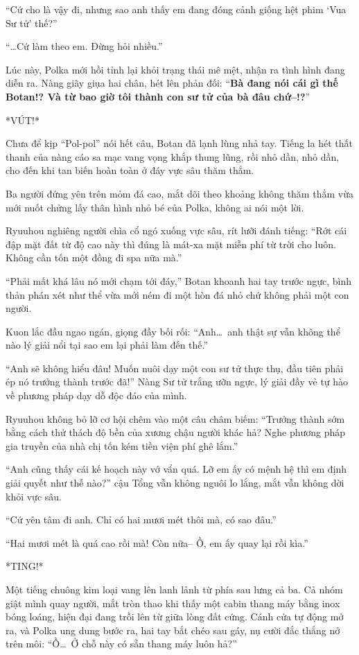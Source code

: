 \documentclass[../main.tex]{subfiles}
\begin{document}
``Cứ cho là vậy đi, nhưng sao anh thấy em đang đóng cảnh giống hệt phim `Vua Sư tử' thế?''

``\dots Cứ làm theo em. Đừng hỏi nhiều.''

Lúc này, Polka mới hồi tỉnh lại khỏi trạng thái mê mệt, nhận ra tình hình đang diễn ra. Nàng giãy giụa hai chân, hét lên phản đối: ``\textbf{Bà đang nói cái gì thế Botan!? Và từ bao giờ tôi thành con sư tử của bà đâu chứ--!?}''

*VÚT!*

Chưa để kịp ``Pol-pol'' nói hết câu, Botan đã lạnh lùng nhả tay. Tiếng la hét thất thanh của nàng cáo sa mạc vang vọng khắp thung lũng, rồi nhỏ dần, nhỏ dần, cho đến khi tan biến hoàn toàn ở đáy vực sâu thăm thẳm.


Ba người đứng yên trên mỏm đá cao, mắt dõi theo khoảng không thăm thẳm vừa mới nuốt chửng lấy thân hình nhỏ bé của Polka, không ai nói một lời.

Ryuuhou nghiêng người chìa cổ ngó xuống vực sâu, rít lưỡi đánh tiếng: ``Rớt cái đập mặt đất từ độ cao này thì đúng là mát-xa mặt miễn phí từ trời cho luôn. Không cần tốn một đồng đi spa nữa mà.''

``Phải mất khá lâu nó mới chạm tới đáy,'' Botan khoanh hai tay trước ngực, bình thản phán xét như thể vừa mới ném đi một hòn đá nhỏ chứ không phải một con người.

Kuon lắc đầu ngao ngán, giọng đầy bối rối: ``Anh\dots\ anh thật sự vẫn không thể nào lý giải nổi tại sao em lại phải làm đến thế.''

``Anh sẽ không hiểu đâu! Muốn nuôi dạy một con sư tử thực thụ, đầu tiên phải ép nó trưởng thành trước đã!'' Nàng Sư tử trắng ưỡn ngực, lý giải đầy vẻ tự hào về phương pháp dạy dỗ độc đáo của mình.

Ryuuhou không bỏ lỡ cơ hội chêm vào một câu châm biếm: ``Trưởng thành sớm bằng cách thử thách độ bền của xương chậu người khác hả? Nghe phương pháp gia truyền của nhà chị tốn kém tiền viện phí ghê lắm.''

``Anh cũng thấy cái kế hoạch này vớ vẩn quá. Lỡ em ấy có mệnh hệ thì em định giải quyết như thế nào?'' cậu Tổng vẫn không nguôi lo lắng, mắt vẫn không dời khỏi vực sâu.

``Cứ yên tâm đi anh. Chỉ có hai mươi mét thôi mà, có sao đâu.''

``Hai mươi mét là quá cao rồi mà! Còn nữa-- Ồ, em ấy quay lại rồi kìa.''

*TING!*

Một tiếng chuông kim loại vang lên lanh lảnh từ phía sau lưng cả ba. Cả nhóm giật mình quay người, mắt tròn thao khi thấy một cabin thang máy bằng inox bóng loáng, hiện đại đang trồi lên từ giữa lòng đất cứng. Cánh cửa tự động mở ra, và Polka ung dung bước ra, hai tay bắt chéo sau gáy, nụ cười đắc thắng nở trên môi: ``Ồ\dots\ Ở chỗ này có sẵn thang máy luôn hả?''
\end{document}
